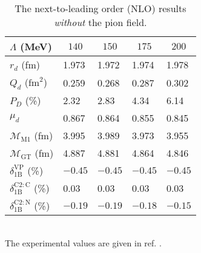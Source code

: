 \documentclass[fleqn,twoside]{article}
\begin{document}
\begin{table*}[htb]
\caption{The next-to-leading order (NLO) results
{\em without} the pion field.}
\label{table:1}
\newcommand{\m}{\hphantom{$-$}}
\newcommand{\cc}[1]{\multicolumn{1}{c}{#1}}
\renewcommand{\tabcolsep}{2pc} %
\renewcommand{\arraystretch}{1.2} %
\begin{tabular}{@{}lllll}
\hline
$\Lambda$ (MeV)           & \cc{$140$} & \cc{$150$} & \cc{$175$} & \cc{$200$} \\
\hline
$r_d$ (fm)                & \m1.973 & \m1.972 & \m1.974 & \m1.978 \\
$Q_d$ ($\mbox{fm}^2$)     & \m0.259 & \m0.268 & \m0.287 & \m0.302 \\
$P_D$ (\%)                & \m2.32  & \m2.83  & \m4.34  & \m6.14  \\
$\mu_d$                   & \m0.867 & \m0.864 & \m0.855 & \m0.845 \\
$\mathcal{M}_{\mathrm{M1}}$ (fm)   & \m3.995 & \m3.989 & \m3.973 & \m3.955 \\
$\mathcal{M}_{\mathrm{GT}}$ (fm)   & \m4.887 & \m4.881 & \m4.864 & \m4.846 \\
$\delta_{\mathrm{1B}}^{\mathrm{VP}}$ (\%)   
                          & $-0.45$ & $-0.45$ & $-0.45$ & $-0.45$ \\
$\delta_{\mathrm{1B}}^{\mathrm{C2:C}}$ (\%) 
                          & \m0.03  & \m0.03  & \m0.03  & \m0.03  \\
$\delta_{\mathrm{1B}}^{\mathrm{C2:N}}$ (\%) 
                          & $-0.19$ & $-0.19$ & $-0.18$ & $-0.15$ \\
\hline
\end{tabular}\\[2pt]
The experimental values are given in ref. \cite{Eato75}.
\end{table*}
\end{document}
